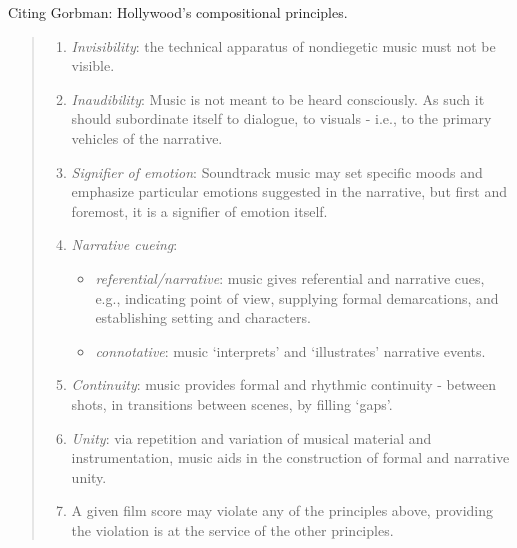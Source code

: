 Citing Gorbman: Hollywood's compositional principles.
\begin{quotation}

\begin{enumerate}
\item \textit{Invisibility}: the technical apparatus of nondiegetic music must not be visible.
\item \textit{Inaudibility}: Music is not meant to be heard consciously. As such it should subordinate itself to dialogue, to visuals - i.e., to the primary vehicles of the narrative.
\item \textit{Signifier of emotion}: Soundtrack music may set specific moods and emphasize particular emotions suggested in the narrative, but first and foremost, it is a signifier of emotion itself.
\item \textit{Narrative cueing}: 
\begin{itemize}
\item \textit{referential/narrative}: music gives referential and narrative cues, e.g., indicating point of view, supplying formal demarcations, and establishing setting and characters.
\item \textit{connotative}: music `interprets' and `illustrates' narrative events.
\end{itemize}
\item \textit{Continuity}: music provides formal and rhythmic continuity - between shots, in transitions between scenes, by filling `gaps'.
\item \textit{Unity}: via repetition and variation of musical material and instrumentation, music aids in the construction of formal and narrative unity.
\item A given film score may violate any of the principles above, providing the violation is at the service of the other principles.

\end{enumerate}
\end{quotation}


